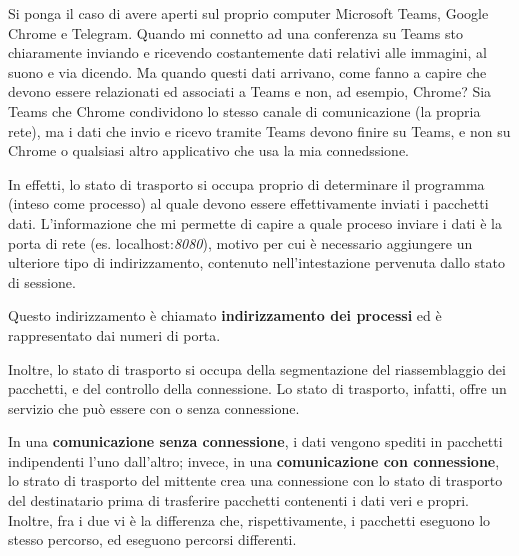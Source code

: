             \vspace{3mm}
            
            Si ponga il caso di avere aperti sul proprio computer Microsoft Teams, Google Chrome e Telegram. Quando mi connetto ad una conferenza su Teams sto chiaramente inviando e ricevendo costantemente dati relativi alle immagini, al suono e via dicendo. Ma quando questi dati arrivano, come fanno a capire che devono essere relazionati ed associati a Teams e non, ad esempio, Chrome? Sia Teams che Chrome condividono lo stesso canale di comunicazione (la propria rete), ma i dati che invio e ricevo tramite Teams devono finire su Teams, e non su Chrome o qualsiasi altro applicativo che usa la mia connedssione.
            
            \vspace{3mm}
            
            In effetti, lo stato di trasporto si occupa proprio di determinare il programma (inteso come processo) al quale devono essere effettivamente inviati i pacchetti dati. L'informazione che mi permette di capire a quale proceso inviare i dati è la porta di rete (es. localhost:\textit{8080}), motivo per cui è necessario aggiungere un ulteriore tipo di indirizzamento, contenuto nell'intestazione pervenuta dallo stato di sessione.
            
            \vspace{3mm}
            
            Questo indirizzamento è chiamato \textbf{indirizzamento dei processi} ed è rappresentato dai numeri di porta.
            
            \vspace{3mm}
            
            Inoltre, lo stato di trasporto si occupa della segmentazione del riassemblaggio dei pacchetti, e del controllo della connessione. Lo stato di trasporto, infatti, offre un servizio che può essere con o senza connessione. 
            
            In una \textbf{comunicazione senza connessione}, i dati vengono spediti in pacchetti indipendenti l'uno dall'altro; invece, in una \textbf{comunicazione con connessione}, lo strato di trasporto del mittente crea una connessione con lo stato di trasporto del destinatario prima di trasferire pacchetti contenenti i dati veri e propri. Inoltre, fra i due vi è la differenza che, rispettivamente, i pacchetti eseguono lo stesso percorso, ed eseguono percorsi differenti.
            
